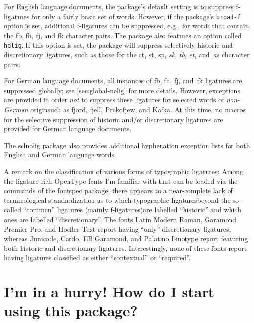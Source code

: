 \documentclass[12pt]{article}
\newcommand{\pkg}[1]{\textsf{#1}}
\newcommand{\opt}[1]{\texttt{#1}}
\begin{document}
For English language documents, the package's default setting is to suppress f-ligatures for only a fairly basic set of words. However, if the package's \opt{broad-f} option is set, additional f-ligatures can be suppressed, e.g., for words that contain the {\ebg \mbox{fb}, \mbox{fh}, \mbox{fj}, and \mbox{fk}} character pairs. The package also features an option called \opt{hdlig}. If this option is set, the package will suppress selectively historic and discretionary ligatures, such as those for the ct, st, sp, {\ebg\emph{sk}}, \emph{th}, \emph{et}, and~\emph{as} character pairs. 


For German language documents, all instances of {\ebg \mbox{fb}, \mbox{fh}, \mbox{fj}, and~\mbox{fk}} ligatures are suppressed globally; see \cref{sec:global-nolig} for more details. However, exceptions are provided in order \emph{not} to suppress these ligatures for selected words of \emph{non-German} origin\textemdash such as fjord, fjell, Prokofjew, and {\ebg Kafka}. At this time, no macros for the selective suppression of historic and/or discretionary ligatures are provided for German language documents.

The \pkg{selnolig} package also provides additional hyphenation exception lists for both English and German language words.

A remark on the classification of various forms of typographic ligatures: Among the ligature-rich OpenType fonts I'm familiar with that can be loaded via the commands of the \pkg{fontspec} package, there appears to a near-complete lack of terminological standardization as to which typographic ligatures\textemdash beyond the so-called \enquote{common} ligatures (mainly f-ligatures)\textemdash are labelled \enquote{historic} and which ones are labelled \enquote{discretionary}. The fonts Latin Modern Roman, Garamond Premier Pro, and Hoefler Text report having \enquote{only} discretionary ligatures, whereas Junicode, Cardo, EB Garamond, and Palatino Linotype report featuring both historic and discretionary ligatures. Interestingly, none of these fonts report having ligatures classified as either \enquote{contextual} or \enquote{required}. 

\section{I'm in a hurry! How do I start using this package?}
\end{document}
